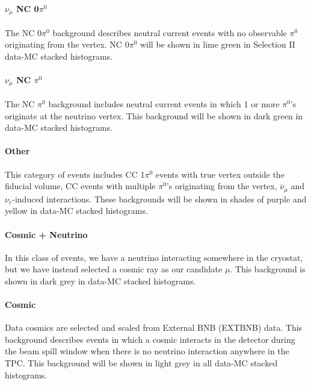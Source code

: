 \paragraph{  $\nu_\mu$ NC 0$\pi^0$}
The NC 0$\pi^0$ background describes neutral current events with no observable $\pi^0$ originating from the vertex.  NC 0$\pi^0$ will be shown in lime green in Selection II data-MC stacked histograms. 


\paragraph{  $\nu_\mu$ NC $\pi^0$}
The NC $\pi^0$ background includes neutral current events in which 1 or more $\pi^0$'s originate at the neutrino vertex.  This background will be shown in dark green in data-MC stacked histograms.


\paragraph{ Other}
This category of events includes CC 1$\pi^0$ events with true vertex outside the fiducial volume, CC events with multiple $\pi^0$'s originating from the vertex, $\overline{\nu}_\mu$ and $\nu_e$-induced interactions.  These backgrounds will be shown in shades of purple and yellow in data-MC stacked histograms.

\paragraph{ Cosmic + Neutrino }
In this class of events, we have a neutrino interacting somewhere in the cryostat, but we have instead selected a cosmic ray as our candidate $\mu$.  This background is shown in dark grey in data-MC stacked histograms.  

\paragraph{Cosmic }
Data cosmics are selected and scaled from External BNB (EXTBNB) data.  This background describes events in which a cosmic interacts in the detector during the beam spill window when there is no neutrino interaction anywhere in the TPC.  This background will be shown in light grey in all data-MC stacked histograms.


